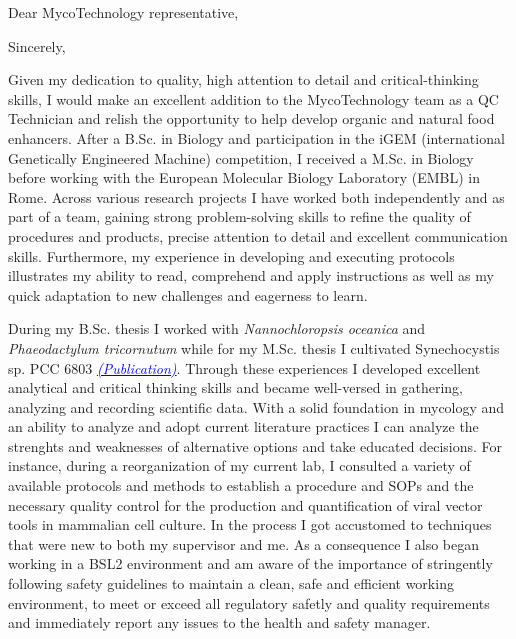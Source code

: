 \documentclass[11pt,a4paper,sans]{moderncv}
\begin{document}
\date{\today}
\opening{Dear MycoTechnology representative,\vspace{-2mm}}
\closing{Sincerely,\vspace*{-4mm} }
\makelettertitle
\begin{spacing}{1.15}

Given my dedication to quality, high attention to detail and critical-thinking skills, I would make an excellent addition to the MycoTechnology team as a QC Technician and relish the opportunity to help develop organic and natural food enhancers. After a B.Sc. in Biology and participation in the iGEM (international Genetically Engineered Machine) competition, I received a M.Sc. in Biology before working with the European Molecular Biology Laboratory (EMBL) in Rome. Across various research projects I have worked both independently and as part of a team, gaining strong problem-solving skills to refine the quality of procedures and products, precise attention to detail and excellent communication skills. Furthermore, my  experience in developing and executing protocols illustrates my ability to read, comprehend and apply instructions as well as my quick adaptation to new challenges and eagerness to learn. \par\vspace*{2mm}

During my B.Sc. thesis I worked with \textit{Nannochloropsis oceanica} and \textit{Phaeodactylum tricornutum} while for my M.Sc. thesis I cultivated Synechocystis sp. PCC 6803 {\href{https://www.ncbi.nlm.nih.gov/pubmed/29517395}{\textcolor{blue}{{\textit{(Publication)}}}}}. Through these experiences I developed excellent analytical and critical thinking skills and became well-versed in gathering, analyzing and recording scientific data. With a solid foundation in mycology  and an ability to analyze and adopt current literature practices I can analyze the strenghts and weaknesses of alternative options and take educated decisions. For instance, during a reorganization of my current lab, I consulted a variety of available protocols and methods to establish a procedure and SOPs and the necessary quality control for the production and quantification of viral vector tools in mammalian cell culture. In the process I got accustomed to  techniques that were new to both my supervisor and me. As a consequence I also began working in a BSL2 environment and am aware of the importance of stringently following safety guidelines to  maintain a clean, safe and efficient working environment, to meet or exceed all regulatory safetly and quality requirements and immediately report any issues to the health and safety manager.\par\vspace*{2mm}


\end{spacing}
\end{document}
